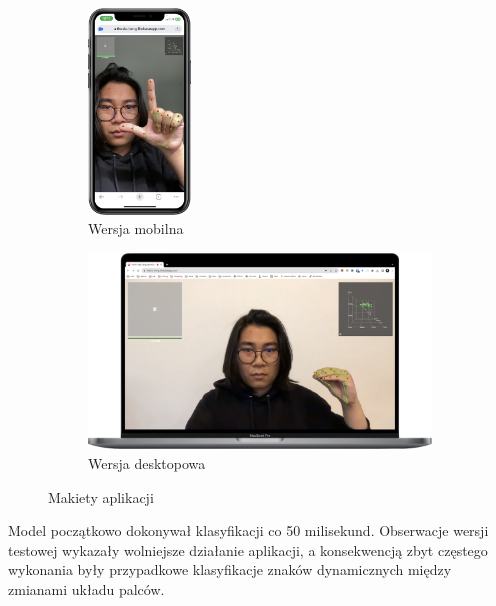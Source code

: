 \begin{figure}[H]
    \centering
    \begin{subfigure}{\textwidth}
        \centering
        \includegraphics[width=0.3\textwidth]{figures/mobile}
        \caption{Wersja mobilna}
        \label{fig:mobile-mockup}
        \vspace{1cm}
    \end{subfigure}
    \begin{subfigure}{\textwidth}
        \centering
        \includegraphics[width=\textwidth]{figures/desktop}
        \caption{Wersja desktopowa}
        \label{fig:desktop-mockup}
    \end{subfigure}
    \caption{Makiety aplikacji}
    \label{fig:mockups}
\end{figure}

Model początkowo dokonywał klasyfikacji co 50 milisekund. Obserwacje wersji testowej wykazały wolniejsze działanie aplikacji, a konsekwencją zbyt częstego wykonania były przypadkowe klasyfikacje znaków dynamicznych między zmianami układu palców.

